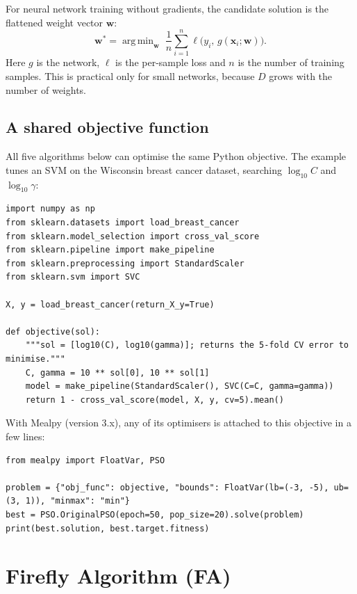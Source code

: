\documentclass[11pt,a4paper]{article}
\DeclareMathOperator*{\argmin}{arg\,min}
\newcommand{\vect}[1]{\mathbf{#1}}
\begin{document}
For neural network training without gradients, the candidate solution is the flattened weight vector $\vect{w}$:
\begin{equation}
  \vect{w}^{*} = \argmin_{\vect{w}} \; \frac{1}{n} \sum_{i=1}^{n} \ell\big(y_i, \, g(\vect{x}_i; \vect{w})\big).
\end{equation}
Here $g$ is the network, $\ell$ is the per-sample loss and $n$ is the number of training samples. This is practical only for small networks, because $D$ grows with the number of weights.

\subsection{A shared objective function}
\label{sec:objective}

All five algorithms below can optimise the same Python objective. The example tunes an SVM on the Wisconsin breast cancer dataset, searching $\log_{10} C$ and $\log_{10} \gamma$:

\begin{lstlisting}
import numpy as np
from sklearn.datasets import load_breast_cancer
from sklearn.model_selection import cross_val_score
from sklearn.pipeline import make_pipeline
from sklearn.preprocessing import StandardScaler
from sklearn.svm import SVC

X, y = load_breast_cancer(return_X_y=True)

def objective(sol):
    """sol = [log10(C), log10(gamma)]; returns the 5-fold CV error to minimise."""
    C, gamma = 10 ** sol[0], 10 ** sol[1]
    model = make_pipeline(StandardScaler(), SVC(C=C, gamma=gamma))
    return 1 - cross_val_score(model, X, y, cv=5).mean()
\end{lstlisting}

With Mealpy (version 3.x), any of its optimisers is attached to this objective in a few lines:

\begin{lstlisting}
from mealpy import FloatVar, PSO

problem = {"obj_func": objective, "bounds": FloatVar(lb=(-3, -5), ub=(3, 1)), "minmax": "min"}
best = PSO.OriginalPSO(epoch=50, pop_size=20).solve(problem)
print(best.solution, best.target.fitness)
\end{lstlisting}

\section{Firefly Algorithm (FA)}
\label{sec:fa}
\end{document}
